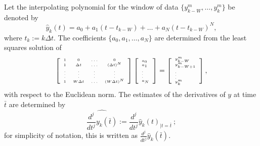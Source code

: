 Let the interpolating polynomial for the window of 
data $ \{ y_{k-W}^m, \ldots, y_k^m \}$
be denoted by
\begin{equation}
\hat{y}_k(t) = a_0 + a_1 (t - t_{k-W}) + \ldots + a_N (t - t_{k-W})^N,
\label{interppoly}
\end{equation}
where $t_k := k \Delta t$.
The coefficients $\{ a_0, a_1, \ldots, a_N \}$ are determined from the least
squares solution of 
\begin{equation} \tiny
\left[ \begin{array}{cccc} 1 & 0 & \ldots & 0 \\
1 & \Delta t & \ldots & (\Delta t)^N \\
\vdots & \vdots & \vdots & \vdots \\
1 & W \Delta t & \ldots & (W \Delta t)^N 
\end{array} \right] \left[ \begin{array}{l} a_0 \\ a_1 \\ \vdots \\ a_N
\end{array} \right]  =  \left[ \begin{array}{l} y^m_{k-W} \\
y^m_{k-W+1} \\ \vdots \\ y^m_k
\end{array} \right], \normalsize
\label{leastsquares}
\end{equation}
with respect to the Euclidean norm.  
The estimates of the derivatives of $y$ at time $\bar{t}$ are determined by
\begin{equation}
\widehat{ \frac{d^j}{dt^j}y_k(\bar{t}) } := \frac{d^j}{dt^j} \hat{y}_k(t)_{|t=\bar{t}} \  ;
\label{derivestimates}
\end{equation}
for simplicity of notation, this is written as 
$\frac{d^j}{dt^j} \hat{y}_k( \bar{t} )$.


